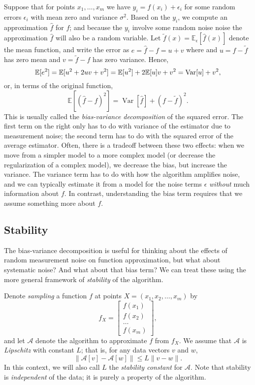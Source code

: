 \documentclass[12pt, leqno]{article} %
\begin{document}
Suppose that for points $x_1, \ldots, x_m$ we have $y_i = f(x_i) + \epsilon_i$
for some random errors $\epsilon_i$ with mean zero and variance $\sigma^2$.
Based on the $y_i$, we compute an approximation $\hat{f}$ for $f$;
and because the $y_i$ involve some random noise noise the
approximation $\hat{f}$ will also be a random variable.  Let
$\tilde{f}(x) = \mathbb{E}_{\epsilon}[\hat{f}(x)]$ denote the mean
function, and write the error as $e = \hat{f}-f = u + v$ where
and $u = \hat{f}-\tilde{f}$ has zero mean and
$v = \tilde{f}-f$ has zero variance.  Hence,
\[
  \mathbb{E}[e^2]
  = \mathbb{E}[u^2 + 2uv + v^2] \\
  = \mathbb{E}[u^2] + 2\mathbb{E}[u] v + v^2 \\
  = \operatorname{Var}[u] + v^2,
\]
or, in terms of the original function,
\[
  \mathbb{E}[(\hat{f}-f)^2] = \operatorname{Var}[\hat{f}] + (f-\tilde{f})^2.
\]
This is usually called the {\em bias-variance decomposition} of the
squared error.  The first term on the right only has to do with
variance of the estimator due to measurement noise; the second term
has to do with the squared error of the average estimator.  Often,
there is a tradeoff between these two effects: when we move from
a simpler model to a more complex model (or decrease the
regularization of a complex model), we decrease the bias, but
increase the variance.  The variance term has to do
with how the algorithm amplifies noise, and we can typically estimate
it from a model for the noise terms $\epsilon$ {\em without} much
information about $f$.  In contrast, understanding the bias term
requires that we assume something more about $f$.

\subsection{Stability}

The bias-variance decomposition is useful for thinking about the
effects of random measurement noise on function approximation, but
what about systematic noise?  And what about that bias term?
We can treat these using the more general framework of
{\em stability} of the algorithm.

Denote {\em sampling} a function $f$ at points
$X = (x_1, x_2, \ldots, x_m)$ by
\[
  f_X = \begin{bmatrix} f(x_1) \\ f(x_2) \\ \ldots \\ f(x_m) \end{bmatrix},
\]
and let $\mathcal{A}$ denote the algorithm to approximate $f$ from
$f_X$.  We assume that $\mathcal{A}$ is {\em Lipschitz} with constant
$L$; that is, for any data vectors $v$ and $w$,
\[
  \|\mathcal{A}[v]-\mathcal{A}[w]\| \leq L\|v-w\|.
\]
In this context, we will also call $L$ the {\em stability constant}
for $\mathcal{A}$.  Note that stability is {\em independent} of the
data; it is purely a property of the algorithm.
\end{document}
